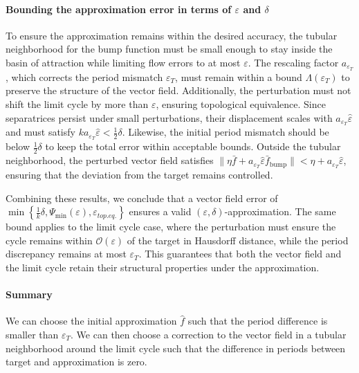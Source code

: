 \documentclass{article}
\newcounter{ct}
\begin{document}
\paragraph{Bounding the approximation error in terms of $\varepsilon$ and $\delta$}  

To ensure the approximation remains within the desired accuracy, the tubular neighborhood for the bump function must be small enough to stay inside the basin of attraction while limiting flow errors to at most $\varepsilon$. The rescaling factor $a_{\varepsilon_T}$, which corrects the period mismatch $\varepsilon_T$, must remain within a bound $\Lambda(\varepsilon_T)$ to preserve the structure of the vector field. Additionally, the perturbation must not shift the limit cycle by more than $\varepsilon$, ensuring topological equivalence.
 Since separatrices persist under small perturbations, their displacement scales with $a_{\varepsilon_T} \hat{\varepsilon}$ and must satisfy $k a_{\varepsilon_T} \hat{\varepsilon} < \frac{1}{2} \delta$.
  Likewise, the initial period mismatch should be below $\frac{1}{2} \delta$ to keep the total error within acceptable bounds.
  Outside the tubular neighborhood, the perturbed vector field satisfies $\| \eta \bar{f} + a_{\varepsilon_T} \hat{\varepsilon} \bar{f}_{\operatorname{bump}} \| < \eta + a_{\varepsilon_T} \hat{\varepsilon}$, ensuring that the deviation from the target remains controlled.  

Combining these results, we conclude that a vector field error of $\min \left\{ \frac{1}{k} \delta, \Psi_{\min}(\varepsilon), \varepsilon_{top.eq.} \right\}$ ensures a valid $(\varepsilon, \delta)$-approximation.
 The same bound applies to the limit cycle case, where the perturbation must ensure the cycle remains within $\mathcal{O}(\varepsilon)$ of the target in Hausdorff distance, while the period discrepancy remains at most $\varepsilon_T$.
 This guarantees that both the vector field and the limit cycle retain their structural properties under the approximation.  



\paragraph{Summary}
We can choose the initial approximation $\hat{f}$ such that the period difference is smaller than $\varepsilon_T$.
We can then choose a correction to the vector field in a tubular neighborhood around the limit cycle such that the difference in periods between target and approximation is zero.
\end{document}
